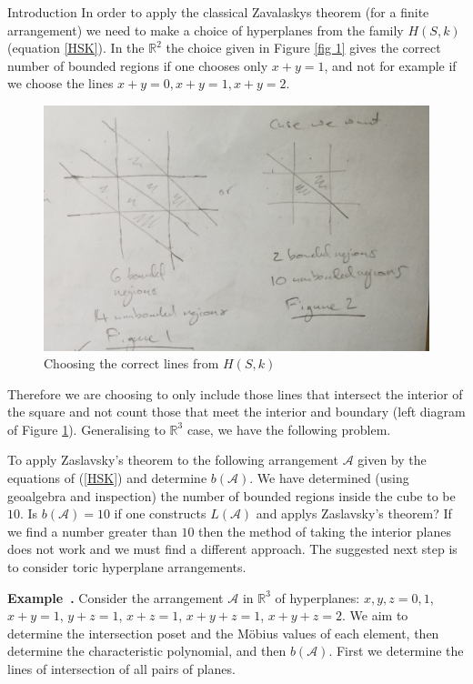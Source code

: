 \documentclass[a4paper,12pt]{article}
\newcounter{example}[]
\newenvironment{example}[1][]{\refstepcounter{example}\par\medskip
   \noindent \textbf{Example~\theexample. #1} \rmfamily}{\medskip}
\theoremstyle{definition}
\theoremstyle{indented}
\begin{document}
\begin{section}{Introduction}
 In order to apply the classical Zavalaskys theorem (for a finite arrangement) we need to make a choice of hyperplanes from the family $H(S,k)$ (equation \ref{HSK}). In the $\mathbb{R}^2$ the choice given in Figure \ref{fig 1} gives the correct number of bounded regions if one chooses only $x+y=1$, and not for example if we choose the lines $x+y=0, x+y=1, x+y=2$.
 
 \begin{figure}[H]
    \centering
 \includegraphics[scale=0.15,angle=0]{29072020 pics/n=4 choice lines.jpg}  
    \caption{Choosing the correct lines from $H(S,k)$}
    \label{fig 6}
\end{figure}
 
 Therefore we are choosing to only include those lines that intersect the interior of the square and not count those that meet the interior and boundary (left diagram of Figure \ref{fig 6}). Generalising to $\mathbb{R}^3$ case, we have the following problem. 
 
 \medskip
 To apply Zaslavsky's theorem to the following arrangement $\mathcal{A}$ given by the equations of (\ref{HSK}) and determine $b(\mathcal{A})$. We have determined (using geoalgebra and inspection) the number of bounded regions inside the cube to be $10$. Is $b(\mathcal{A}) =10$ if one constructs $L(\mathcal{A})$ and applys Zaslavsky's theorem? If we find a number greater than $10$ then the method of taking the interior planes does not work and we must find a different approach. The suggested next step is to consider toric hyperplane arrangements. 
 
\begin{example}
Consider the arrangement $\mathcal{A}$ in $\mathbb{R}^3$ of hyperplanes: $x,y,z= 0,1$, $x+y=1$, $y+z=1$, $x+z=1$, $x+y+z=1$, $x+y+z=2$. We aim to determine the intersection poset and the Möbius values of each element, then determine the characteristic polynomial, and then $b(\mathcal{A})$. First we determine the lines of intersection of all pairs of planes.


\end{example}
\end{section}
\end{document}
